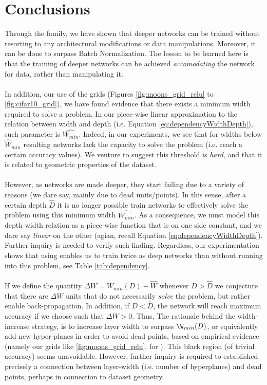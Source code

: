 \section{Conclusions}\label{sec:conclusions}
Through the \SepConstraint family, we have shown that deeper networks can be trained without resorting to any architectural modifications or data manipulations. Moreover, it can be done to surpass Batch Normalization. The lesson to be learned here is that the training of deeper networks can be achieved \emph{accomodating} the network for data, rather than manipulating it.
\\\\
In addition, our use of the grids (Figures \ref{fig:moons_grid_relu} to \ref{fig:cifar10_grid}), we have found evidence that there exists a minimum width required to solve a problem. In our piece-wise linear approximation to the relation between width and depth (i.e. Equation \ref{eq:dependencyWidthDepth}), such parameter is $\hat{W_{min}}$. Indeed, in our experiments, we see that for widths below $\hat{W}_{min}$ resulting networks lack the capacity to solve the problem (i.e. reach a certain accuracy values). We venture to suggest this threshold is \emph{hard}, and that it is related to geometric properties of the dataset. 
\\\\
However, as networks are made deeper, they start failing due to a variety of reasons (we dare say, mainly due to dead units/points). In this sense,  after a certain depth $\hat{D}$ it is no longer possible train networks to effectively solve the problem using this minimum width $\hat{W_{min}}$. As a consequence, we must model this depth-width relation as a piece-wise function that is on one side constant, and we dare say \emph{linear} on the other (agian, recall Equation \ref{eq:dependencyWidthDepth}). Further inquiry is needed to verify such finding. Regardless, our experimentation shows that using \SepUnitPoint enables us to train twice as deep networks than \ReLUBN without running into this problem, see Table \ref{tab:dependency}. 
\\\\
If we define the quantity  $\Delta{W} = W_{min}(D) - \hat{W}$ whenever $D > \hat{D}$ we conjecture that there are $\Delta{W}$ units that do not necessarily \emph{solve} the problem, but rather enable back-propagation. In addition, if $D<\hat{D}$, the network will reach maximum accuracy if we choose such that $\Delta{W}>0$. Thus, The rationale behind the width-increase strategy, is to increase layer width to surpass $\W_{min}(D)$, or equivalently add new hyper-planes in order to avoid dead points, based on empirical evidence (namely our grids like \ref{fig:moons_grid_relu}, for \ReLU). This black region (of trivial accuracy) seems unavoidable. However, further inquiry is required to established precisely a connection between layer-width (i.e. number of hyperplanes) and dead points, perhaps in connection to dataset geometry. 
\\\\


